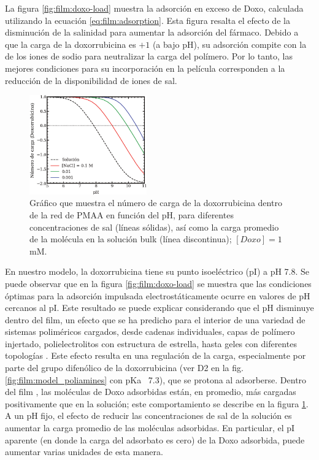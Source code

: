 La figura  \ref{fig:film:doxo-load} muestra la adsorci\'on en exceso de Doxo, calculada utilizando la ecuaci\'on \ref{eq:film:adsorption}. Esta figura resalta el efecto de la disminuci\'on de la salinidad para aumentar la adsorci\'on del f\'armaco. Debido a que la carga de la doxorrubicina es $+1$ (a bajo pH), su adsorci\'on compite con la de los iones de sodio para neutralizar la carga del pol\'imero. Por lo tanto, las mejores condiciones para su incorporaci\'on en la pel\'icula corresponden a la reducci\'on de la disponibilidad de iones  de sal.


\begin{figure}[!htb]
	\centering
	\includegraphics[width=0.45\textwidth]{Figures/graph-film/doxo-charge.pdf}
	\caption{Gr\'afico que muestra el n\'umero de carga de la doxorrubicina dentro de la red de PMAA en funci\'on del pH, para diferentes concentraciones de sal (l\'ineas s\'olidas), as\'i como la carga promedio de la mol\'ecula en la soluci\'on bulk (l\'inea discontinua); $[Doxo]=1$ mM. }
	\label{fig:film:doxo-charge}
\end{figure}

En nuestro modelo, la doxorrubicina tiene su punto isoel\'ectrico (pI) a pH 7.8. Se puede observar que en  la figura  \ref{fig:film:doxo-load} se muestra que las condiciones \'optimas para la adsorci\'on impulsada electrost\'aticamente ocurre en valores de pH cercanos al pI. Este resultado se puede explicar considerando que el pH disminuye dentro del film, un efecto que se ha predicho para el interior de una variedad de sistemas polim\'ericos cargados, desde cadenas individuales, capas de pol\'imero injertado, polielectrolitos con estructura de estrella, hasta geles con diferentes topolog\'ias  \cite{nap2006weak,Borisov2011,Longo2011,polotsky2013collapse,Murmiliuk2018}. Este efecto resulta en una regulaci\'on de la carga, especialmente por parte del grupo difen\'olico de la doxorrubicina (ver D2 en la fig. \ref{fig:film:model_poliamines} con pKa~ 7.3), que se protona al adsorberse. Dentro del film , las mol\'eculas de Doxo adsorbidas est\'an, en promedio, m\'as cargadas positivamente que en la soluci\'on; este comportamiento se describe en la figura \ref{fig:film:doxo-charge}. A un pH fijo, el efecto de reducir las concentraciones de sal de la soluci\'on es aumentar la carga promedio de las mol\'eculas adsorbidas. En particular, el pI aparente (en donde la carga del adsorbato es cero) de la Doxo adsorbida, puede aumentar varias unidades de esta manera.

